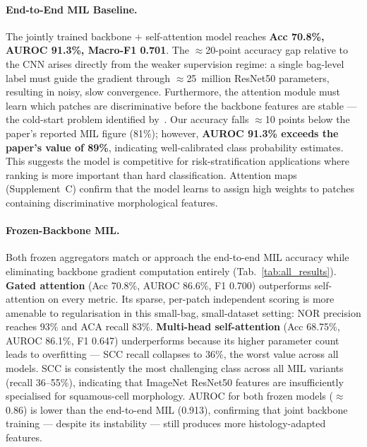 \documentclass[10pt,twocolumn,letterpaper]{article}
\begin{document}
\paragraph{End-to-End MIL Baseline.}
The jointly trained backbone $+$ self-attention model reaches \textbf{Acc 70.8\%, AUROC 91.3\%, Macro-F1 0.701}. The $\approx$20-point accuracy gap relative to the CNN arises directly from the weaker supervision regime: a single bag-level label must guide the gradient through $\approx$25~million ResNet50 parameters, resulting in noisy, slow convergence. Furthermore, the attention module must learn which patches are discriminative before the backbone features are stable — the cold-start problem identified by~\cite{srinidhi2021}. Our accuracy falls $\approx$10 points below the paper's reported MIL figure (81\%); however, \textbf{AUROC 91.3\% exceeds the paper's value of 89\%}, indicating well-calibrated class probability estimates. This suggests the model is competitive for risk-stratification applications where ranking is more important than hard classification. Attention maps (Supplement~C) confirm that the model learns to assign high weights to patches containing discriminative morphological features.

\paragraph{Frozen-Backbone MIL.}
Both frozen aggregators match or approach the end-to-end MIL accuracy while eliminating backbone gradient computation entirely (Tab.~\ref{tab:all_results}). \textbf{Gated attention} (Acc 70.8\%, AUROC 86.6\%, F1 0.700) outperforms self-attention on every metric. Its sparse, per-patch independent scoring is more amenable to regularisation in this small-bag, small-dataset setting: NOR precision reaches 93\% and ACA recall 83\%. \textbf{Multi-head self-attention} (Acc 68.75\%, AUROC 86.1\%, F1 0.647) underperforms because its higher parameter count leads to overfitting — SCC recall collapses to 36\%, the worst value across all models. SCC is consistently the most challenging class across all MIL variants (recall 36--55\%), indicating that ImageNet ResNet50 features are insufficiently specialised for squamous-cell morphology. AUROC for both frozen models ($\approx$0.86) is lower than the end-to-end MIL (0.913), confirming that joint backbone training — despite its instability — still produces more histology-adapted features.
\end{document}
